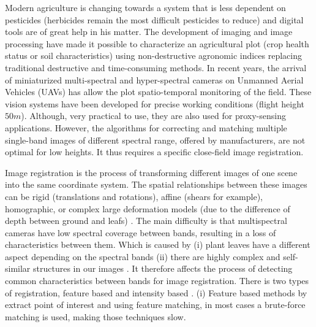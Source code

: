 \documentclass[]{elsarticle}
\begin{document}
	\par Modern agriculture is changing towards a system that is less dependent on pesticides \cite{10.1371/journal.pone.0097922}
	(herbicides remain the most difficult pesticides to reduce) and digital tools are of great help in his matter.
	The development of imaging and image processing have made it possible to characterize an agricultural plot \cite{SANKARAN2015112}
	(crop health status or soil characteristics) using non-destructive agronomic indices \cite{doi:10.1080/02757259509532298, filella1995evaluating, 10.1371/journal.pone.0072736}
	replacing traditional destructive and time-consuming methods.
	In recent years, the arrival of miniaturized multi-spectral and hyper-spectral cameras on Unmanned Aerial Vehicles (UAVs)
	has allow the plot spatio-temporal monitoring of the field. These vision systems have been developed for precise working conditions (flight height $50m$).
	Although, very practical to use, they are also used for proxy-sensing applications.
	However, the algorithms for correcting and matching multiple single-band images of different spectral range,
	offered by manufacturers, are not optimal for low heights. It thus requires a specific close-field image registration.
	\\
	\par Image registration is the process of transforming different images of one scene into the same coordinate system.
	The spatial relationships between these images can be rigid (translations and rotations), affine (shears for example),
	homographic, or complex large deformation models (due to the difference of depth between ground and leafs) \cite{Kamoun}.
	The main difficulty is that multispectral cameras have low spectral coverage between bands, resulting in a loss of characteristics between them.
	Which is caused by (i) plant leaves have a different aspect depending on the spectral bands
	(ii) there are highly complex and self-similar structures in our images \cite{douarre:hal-02183837}.
	It therefore affects the process of detecting common characteristics between bands for image registration.
	There is two types of registration, feature based and intensity based \cite{Zitova}.
	(i) Feature based methods by extract point of interest and using feature matching, in most cases a brute-force matching is used, making those techniques slow.
\end{document}
